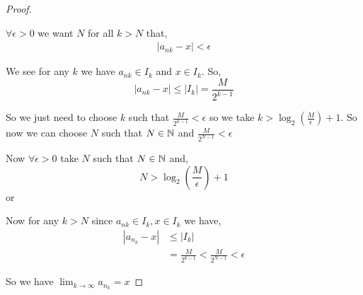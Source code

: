 \begin{proof}
\begin{swork}
    $\forall \epsilon > 0$ we want $N$ for all $ k > N$ that, 
    \begin{align*}
    |a_{nk} - x| < \epsilon
    \end{align*}

We see for any $k$ we have  $a_{nk} \in I_k$ and  $x \in I_k$. So,  $$|a_{nk} - x| \le |I_k| = \frac{M}{2^{k - 1}}$$  

So we just need to choose $k$ such that $\frac{M}{2^{k - 1}} < \epsilon$ so we take $k > \log_2(\frac{M}{\epsilon}) + 1$. So now we can choose $N$ such that $N \in \mathbb{N}$ and  $\frac{M}{2^{N - 1}} < \epsilon$
\end{swork}


Now $\forall \epsilon > 0$ take $N $ such that  $N \in \mathbb{N}$ and,  
$$ N > \log_2 (\frac{M}{\epsilon}) + 1 $$  or 

Now for any $k > N$ since  $a_{nk} \in I_k, x \in I_k$ we have,  
\begin{align*}
    |a_n_k - x| &\le |I_k|\\
                &= \frac{M}{2^{k - 1}} < \frac{M}{2^{N - 1}} < \epsilon
\end{align*}

So we have $\lim_{k \to \infty} a_n_k = x$

\end{proof}
